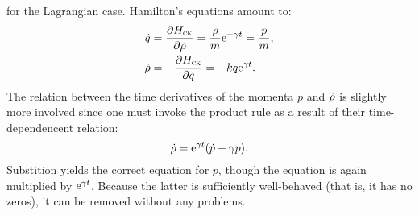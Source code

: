for the Lagrangian case. Hamilton's equations amount to: \cite{Tokieda2021}
\begin{equation*}
    \begin{split}
        \dot{q} &= \pdv{\ensuremath{H_\text{\tiny{\textsc{CK}}}}}{\ensuremath{\rho}} = \frac{\rho}{m}\mathrm{e}^{-\gamma t} =  \frac{p}{m}, \\
        \dot{\rho} &= -\pdv{\ensuremath{H_\text{\tiny{\textsc{CK}}}}}{q} = -kq\mathrm{e}^{\gamma t}.\\
    \end{split}
\end{equation*}
The relation between the time derivatives of the momenta $\dot{p}$ and $\dot{\rho}$ is slightly more involved since one must invoke the product rule as a result of their time-dependencent relation:
    $$ \dot{\rho} = \mathrm{e}^{\gamma t}\qty(\dot{p} + \gamma p). $$
Substition yields the correct equation for $p$, though the equation is again multiplied by $\mathrm{e}^{\gamma t}$. Because the latter is sufficiently well-behaved (that is, it has no zeros), it can be removed without any problems.

